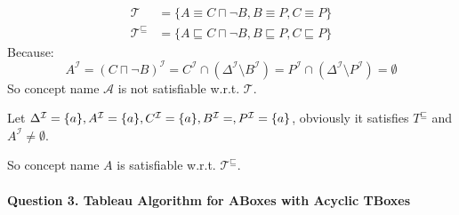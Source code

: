 \documentclass[12pt]{article}
\begin{document}
\begin{enumerate}
\begin{equation}
\begin{aligned}
            \mathcal{T} &= \{ A \equiv C \sqcap \lnot B, B \equiv P, C \equiv P \} \\
            \mathcal{T}^{\sqsubseteq} &= \{ A \sqsubseteq C \sqcap \lnot B, B \sqsubseteq P, C \sqsubseteq P \} \nonumber
        \end{aligned}
    \end{equation}
    Because: 
    \begin{equation}
        A^{\mathcal{I}} = (C \sqcap \lnot B)^{\mathcal{I}} = C^{\mathcal{I}} \cap (\Delta^{\mathcal{I}} \setminus B^{\mathcal{I}}) = P^{\mathcal{I}} \cap (\Delta^{\mathcal{I}} \setminus P^{\mathcal{I}}) = \emptyset \nonumber
    \end{equation}
    So concept name $\mathcal{A}$ is not satisfiable w.r.t. $\mathcal{T}$.\par
    Let $\Delta^{\mathcal{I}} = \{ a \}, A^{\mathcal{I}} = \{ a \}, C^{\mathcal{I}} = \{ a \}, B^{\mathcal{I}} = \empty, P^{\mathcal{I}} = \{ a \}$, obviously it satisfies $T^{\sqsubseteq}$ and $A^{\mathcal{I}}\neq \emptyset$.\par
    So concept name $A$ is satisfiable w.r.t. $\mathcal{T}^{\sqsubseteq}$.
    \end{enumerate}

    \paragraph{Question 3. Tableau Algorithm for ABoxes with Acyclic TBoxes}~{}
    \\
\end{document}
